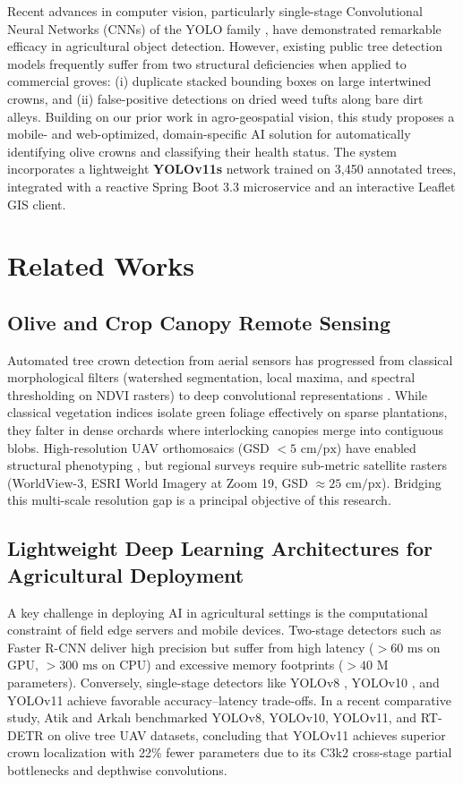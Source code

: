 \documentclass[5p,times]{elsarticle}
\begin{document}
Recent advances in computer vision, particularly single-stage Convolutional Neural Networks (CNNs) of the YOLO family \cite{redmon2024yolov8, jocher2024yolo11}, have demonstrated remarkable efficacy in agricultural object detection. However, existing public tree detection models frequently suffer from two structural deficiencies when applied to commercial groves: (i) duplicate stacked bounding boxes on large intertwined crowns, and (ii) false-positive detections on dried weed tufts along bare dirt alleys. Building on our prior work in agro-geospatial vision, this study proposes a mobile- and web-optimized, domain-specific AI solution for automatically identifying olive crowns and classifying their health status. The system incorporates a lightweight \textbf{YOLOv11s} network trained on 3,450 annotated trees, integrated with a reactive Spring Boot 3.3 microservice and an interactive Leaflet GIS client.

\section{Related Works}
\subsection{Olive and Crop Canopy Remote Sensing}
Automated tree crown detection from aerial sensors has progressed from classical morphological filters (watershed segmentation, local maxima, and spectral thresholding on NDVI rasters) to deep convolutional representations \cite{pena2018object, mesas2020open}. While classical vegetation indices isolate green foliage effectively on sparse plantations, they falter in dense orchards where interlocking canopies merge into contiguous blobs. High-resolution UAV orthomosaics (GSD $< 5\text{ cm/px}$) have enabled structural phenotyping \cite{mesas2020open}, but regional surveys require sub-metric satellite rasters (WorldView-3, ESRI World Imagery at Zoom 19, GSD $\approx 25\text{ cm/px}$). Bridging this multi-scale resolution gap is a principal objective of this research.

\subsection{Lightweight Deep Learning Architectures for Agricultural Deployment}
A key challenge in deploying AI in agricultural settings is the computational constraint of field edge servers and mobile devices. Two-stage detectors such as Faster R-CNN \cite{ren2017faster} deliver high precision but suffer from high latency ($> 60\text{ ms}$ on GPU, $> 300\text{ ms}$ on CPU) and excessive memory footprints ($> 40\text{ M}$ parameters). Conversely, single-stage detectors like YOLOv8 \cite{redmon2024yolov8}, YOLOv10 \cite{atik2026benchmarking}, and YOLOv11 \cite{jocher2024yolo11} achieve favorable accuracy--latency trade-offs. In a recent comparative study, Atik and Arkal\i{} \cite{atik2026benchmarking} benchmarked YOLOv8, YOLOv10, YOLOv11, and RT-DETR on olive tree UAV datasets, concluding that YOLOv11 achieves superior crown localization with 22\% fewer parameters due to its C3k2 cross-stage partial bottlenecks and depthwise convolutions.
\end{document}
